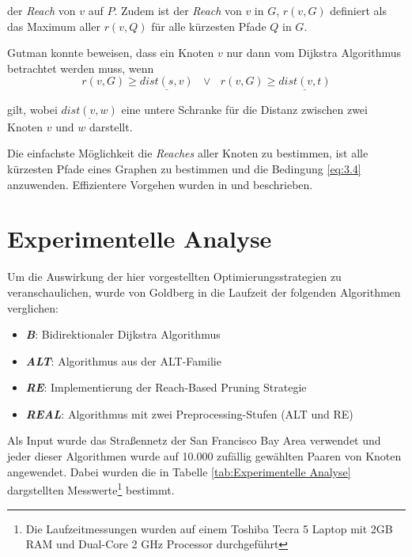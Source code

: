 der \textit{Reach} von $v$ auf $P$. Zudem ist der \textit{Reach} von $v$ in $G$, $r(v,G)$ definiert als das Maximum aller $r(v,Q)$ für alle kürzesten Pfade $Q$ in $G$. 

Gutman konnte beweisen, dass ein Knoten $v$ nur dann vom Dijkstra Algorithmus betrachtet werden muss, wenn 
\begin{equation} \label{eq:3.4}
	r(v,G) \ge \underline{dist(s,v)} \: \: \: \vee \: \: \: r(v,G) \ge \underline{dist(v,t)}
\end{equation}

gilt, wobei $\underline{dist(v,w)}$ eine untere Schranke für die Distanz zwischen zwei Knoten $v$ und $w$ darstellt. 

Die einfachste Möglichkeit die \textit{Reaches} aller Knoten zu bestimmen, ist alle kürzesten Pfade eines Graphen zu bestimmen und die Bedingung \ref{eq:3.4}  anzuwenden. Effizientere Vorgehen wurden in \cite{Goldberg2007} und \cite{Gutman2004} beschrieben.

\newpage
\section{Experimentelle Analyse}
Um die Auswirkung der hier vorgestellten Optimierungsstrategien zu veranschaulichen, wurde von Goldberg in \cite{Goldberg2007} die Laufzeit der folgenden Algorithmen verglichen:
\begin{itemize}
	\item \textit{\textbf{B}}: Bidirektionaler Dijkstra Algorithmus 
	\item \textit{\textbf{ALT}}: Algorithmus aus der ALT-Familie 
	\item \textit{\textbf{RE}}: Implementierung der Reach-Based Pruning Strategie 
	\item \textit{\textbf{REAL}}: Algorithmus mit zwei Preprocessing-Stufen (ALT und RE)
\end{itemize}
Als Input wurde das Straßennetz der San Francisco Bay Area verwendet und jeder dieser Algorithmen wurde auf 10.000 zufällig gewählten Paaren von Knoten angewendet. Dabei wurden die in Tabelle \ref{tab:Experimentelle Analyse} dargstellten Messwerte\footnote{Die Laufzeitmessungen wurden auf einem Toshiba Tecra 5 Laptop mit 2GB RAM und Dual-Core 2 GHz Processor durchgeführt} bestimmt.

